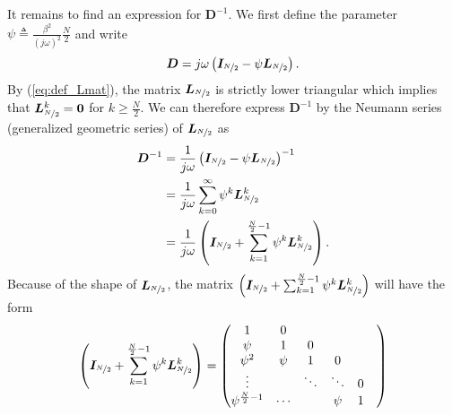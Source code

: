 It remains to find an expression for $\bm{D}^{-1}$. We first define the parameter $\psi \triangleq \frac{\beta^2}{(j\omega)^2}\frac{N}{2}$ and write
\begin{equation}
    \bm{D} = j\omega \left( \bm{I}_{\nicefrac{N}{2}} - \psi \bm{L}_{\nicefrac{N}{2}} \right).
\end{equation}
By (\ref{eq:def_Lmat}), the matrix $\bm{L}_{\nicefrac{N}{2}}$ is strictly lower triangular which implies that $\bm{L}_{\nicefrac{N}{2}}^k = \bm{0}$ for $k \geq \frac{N}{2}$. We can therefore express $\bm{D}^{-1}$ by the Neumann series (generalized geometric series) of $\bm{L}_{\nicefrac{N}{2}}$ as
\begin{align}
    \bm{D}^{-1} & = \frac{1}{j\omega} \left( \bm{I}_{\nicefrac{N}{2}} - \psi \bm{L}_{\nicefrac{N}{2}} \right)^{-1} \\
                & = \frac{1}{j\omega} \sum_{k=0}^{\infty}\psi^k \bm{L}_{\nicefrac{N}{2}}^k \label{eq:Dinv_Neumann} \\
                & = \frac{1}{j\omega} \left( \bm{I}_{\nicefrac{N}{2}} + \sum_{k=1}^{\frac{N}{2}-1}\psi^k \bm{L}_{\nicefrac{N}{2}}^k \right).
\end{align}
Because of the shape of $\bm{L}_{\nicefrac{N}{2}}$, the matrix $\left( \bm{I}_{\nicefrac{N}{2}} + \sum_{k=1}^{\frac{N}{2}-1}\psi^k \bm{L}_{\nicefrac{N}{2}}^k \right)$ will have the form
\begin{equation}
    \left( \bm{I}_{\nicefrac{N}{2}} + \sum_{k=1}^{\frac{N}{2}-1}\psi^k \bm{L}_{\nicefrac{N}{2}}^k \right) =
    \begin{pmatrix}
        1 & 0 &  & & &   \\
        \psi & 1 & 0 &  & & \\
        \psi^2 & \psi & 1 & 0 &  &  \\
        \vdots &  & \ddots  & \ddots &  0 \\
        \psi^{\frac{N}{2}-1} & \cdots &  & \psi & 1
    \end{pmatrix}
\end{equation}

